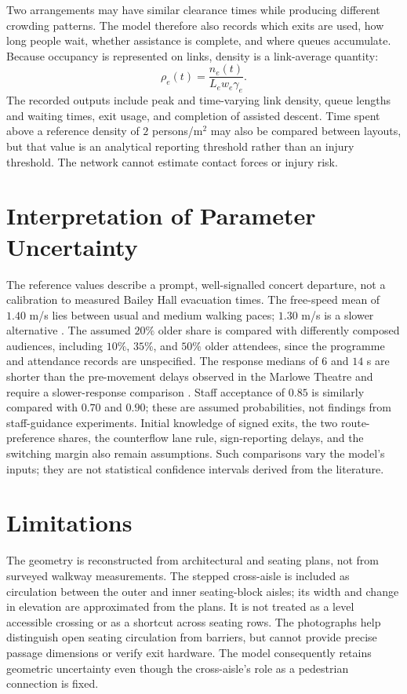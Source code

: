 \documentclass[11pt,a4paper]{article}
\begin{document}
Two arrangements may have similar clearance times while producing different crowding patterns. The model therefore also records which exits are used, how long people wait, whether assistance is complete, and where queues accumulate. Because occupancy is represented on links, density is a link-average quantity:
\begin{equation}\label{eq:density}
\rho_e(t)=\frac{n_e(t)}{L_ew_e\gamma_e}.
\end{equation}
The recorded outputs include peak and time-varying link density, queue lengths and waiting times, exit usage, and completion of assisted descent. Time spent above a reference density of $2$ persons/m$^2$ may also be compared between layouts, but that value is an analytical reporting threshold rather than an injury threshold. The network cannot estimate contact forces or injury risk.

\section{Interpretation of Parameter Uncertainty}

The reference values describe a prompt, well-signalled concert departure, not a calibration to measured Bailey Hall evacuation times. The free-speed mean of $1.40$ m/s lies between usual and medium walking paces; $1.30$ m/s is a slower alternative \cite{murtagh}. The assumed $20\%$ older share is compared with differently composed audiences, including $10\%$, $35\%$, and $50\%$ older attendees, since the programme and attendance records are unspecified. The response medians of $6$ and $14$ s are shorter than the pre-movement delays observed in the Marlowe Theatre and require a slower-response comparison \cite{galea2017theatre}. Staff acceptance of $0.85$ is similarly compared with $0.70$ and $0.90$; these are assumed probabilities, not findings from staff-guidance experiments. Initial knowledge of signed exits, the two route-preference shares, the counterflow lane rule, sign-reporting delays, and the switching margin also remain assumptions. Such comparisons vary the model's inputs; they are not statistical confidence intervals derived from the literature.

\section{Limitations}

The geometry is reconstructed from architectural and seating plans, not from surveyed walkway measurements. The stepped cross-aisle is included as circulation between the outer and inner seating-block aisles; its width and change in elevation are approximated from the plans. It is not treated as a level accessible crossing or as a shortcut across seating rows. The photographs help distinguish open seating circulation from barriers, but cannot provide precise passage dimensions or verify exit hardware. The model consequently retains geometric uncertainty even though the cross-aisle's role as a pedestrian connection is fixed.
\end{document}
